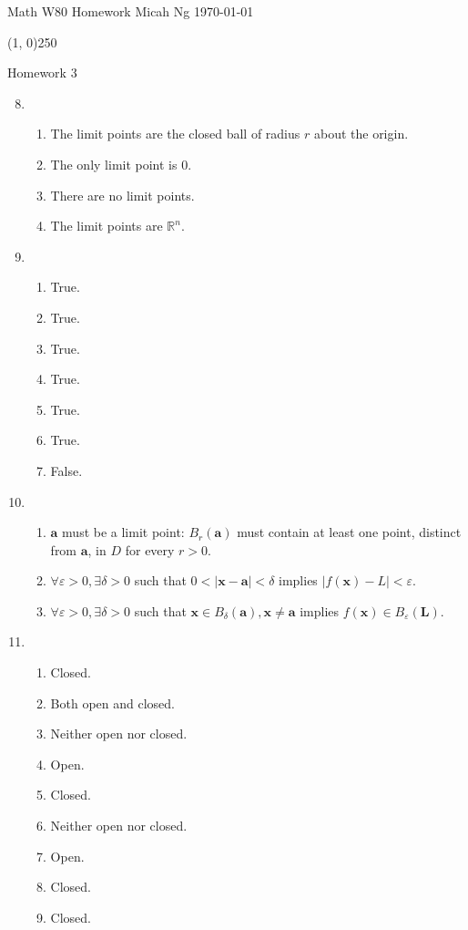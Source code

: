 \documentclass[11pt,letterpaper]{article}
\begin{document}
\noindent
Math W80 Homework \hfill Micah Ng \hfill \today

\begin{center}
\line(1, 0){250}
\end{center}

\noindent
Homework 3

\begin{enumerate}
\setcounter{enumi}{7}
\item
  \begin{enumerate}
  \item
    The limit points are the closed ball of radius $r$ about the origin.

  \item
    The only limit point is 0.

  \item
    There are no limit points.

  \item
    The limit points are $\mathbb{R}^n$.
  \end{enumerate}

\item
  \begin{enumerate}
  \item True.
  \item True.
  \item True.
  \item True.
  \item True.
  \item True.
  \item False.
  \end{enumerate}

\item
  \begin{enumerate}
  \item
    $\mathbf{a}$ must be a limit point: $B_r(\mathbf{a})$ must contain at least
    one point, distinct from $\mathbf{a}$, in $D$ for every $r>0$.

  \item
    $\forall\varepsilon>0,\exists\delta>0$ such that
    $0<|\mathbf{x}-\mathbf{a}|<\delta$ implies $|f(\mathbf{x})-L|<\varepsilon$.

  \item
    $\forall\varepsilon>0,\exists\delta>0$ such that
    $\mathbf{x}\in B_\delta(\mathbf{a}),\mathbf{x}\neq\mathbf{a}$ implies
    $f(\mathbf{x})\in B_\varepsilon(\mathbf{L})$.
  \end{enumerate}

\item
  \begin{enumerate}
  \item Closed.
  \item Both open and closed.
  \item Neither open nor closed.
  \item Open.
  \item Closed.
  \item Neither open nor closed.
  \item Open.
  \item Closed.
  \item Closed.
  \end{enumerate}


\end{enumerate}
\end{document}
